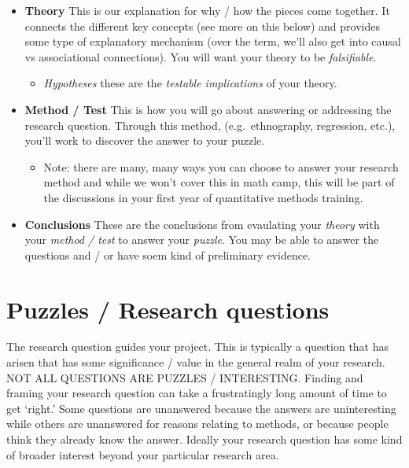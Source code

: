 \documentclass[
]{book}
\providecommand{\tightlist}{%
  \setlength{\itemsep}{0pt}\setlength{\parskip}{0pt}}
\begin{document}
\begin{itemize}
\tightlist
\item
  \textbf{Theory} This is our explanation for why / how the pieces come together. It connects the different key concepts (see more on this below) and provides some type of explanatory mechanism (over the term, we'll also get into causal vs associational connections). You will want your theory to be \emph{falsifiable}.

  \begin{itemize}
  \tightlist
  \item
    \emph{Hypotheses} these are the \emph{testable implications} of your theory.
  \end{itemize}
\item
  \textbf{Method / Test} This is how you will go about answering or addressing the research question. Through this method, (e.g.~ethnography, regression, etc.), you'll work to discover the answer to your puzzle.

  \begin{itemize}
  \tightlist
  \item
    Note: there are many, many ways you can choose to answer your research method and while we won't cover this in math camp, this will be part of the discussions in your first year of quantitative methods training.
  \end{itemize}
\item
  \textbf{Conclusions} These are the conclusions from evaulating your \emph{theory} with your \emph{method / test} to answer your \emph{puzzle}. You may be able to answer the questions and / or have soem kind of preliminary evidence.
\end{itemize}

\hypertarget{puzzles-research-questions}{%
\section{Puzzles / Research questions}\label{puzzles-research-questions}}

The research question guides your project. This is typically a question that has arisen that has some significance / value in the general realm of your research. NOT ALL QUESTIONS ARE PUZZLES / INTERESTING. Finding and framing your research question can take a frustratingly long amount of time to get `right.' Some questions are unanswered because the answers are uninteresting while others are unanswered for reasons relating to methods, or because people think they already know the answer. Ideally your research question has some kind of broader interest beyond your particular research area.
\end{document}
